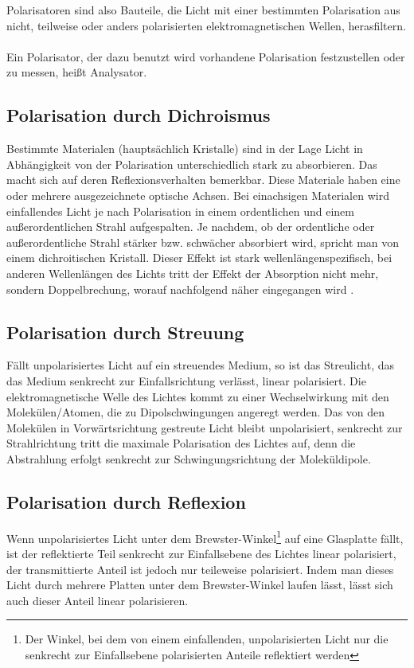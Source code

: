 \documentclass[a4paper,titlepage]{scrartcl}
\numberwithin{equation}{section}
\begin{document}
Polarisatoren sind also Bauteile, die Licht mit einer bestimmten Polarisation aus nicht, teilweise oder anders polarisierten elektromagnetischen Wellen, herasfiltern.\\ \\
Ein Polarisator, der dazu benutzt wird vorhandene Polarisation festzustellen oder zu messen, heißt Analysator.

\subsection{Polarisation durch Dichroismus}
Bestimmte Materialen (hauptsächlich Kristalle) sind in der Lage Licht in Abhängigkeit von der Polarisation unterschiedlich stark zu absorbieren. Das macht sich auf deren Reflexionsverhalten bemerkbar. Diese Materiale haben eine oder mehrere ausgezeichnete optische Achsen. Bei einachsigen Materialen wird einfallendes Licht je nach Polarisation in einem ordentlichen und einem außerordentlichen Strahl aufgespalten. Je nachdem, ob der ordentliche oder außerordentliche Strahl stärker bzw. schwächer absorbiert wird, spricht man von einem dichroitischen Kristall. Dieser Effekt ist stark wellenlängenspezifisch, bei anderen Wellenlängen des Lichts tritt der Effekt der Absorption nicht mehr, sondern Doppelbrechung, worauf nachfolgend näher eingegangen wird \cite{wiki:dichroismus}.

\subsection{Polarisation durch Streuung}
Fällt unpolarisiertes Licht auf ein streuendes Medium, so ist das Streulicht, das das Medium senkrecht zur Einfallsrichtung verlässt, linear polarisiert. Die elektromagnetische Welle des Lichtes kommt zu einer Wechselwirkung mit den Molekülen/Atomen, die zu Dipolschwingungen angeregt werden. Das von den Molekülen in Vorwärtsrichtung gestreute Licht bleibt unpolarisiert, senkrecht zur Strahlrichtung tritt die maximale Polarisation des Lichtes auf, denn die Abstrahlung erfolgt senkrecht zur Schwingungsrichtung der Moleküldipole.

\subsection{Polarisation durch Reflexion}
Wenn unpolarisiertes Licht unter dem Brewster-Winkel\footnote{Der Winkel, bei dem von einem einfallenden, unpolarisierten Licht nur die senkrecht zur Einfallsebene polarisierten Anteile reflektiert werden} auf eine Glasplatte fällt, ist der reflektierte Teil senkrecht zur Einfallsebene des Lichtes linear polarisiert, der transmittierte Anteil ist jedoch nur teileweise polarisiert. Indem man dieses Licht durch mehrere Platten unter dem Brewster-Winkel laufen lässt, lässt sich auch dieser Anteil linear polarisieren.
\end{document}
